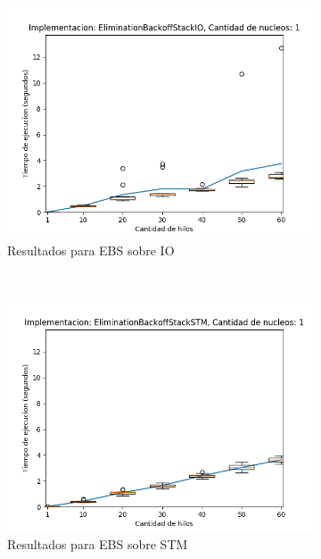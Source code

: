 \begin{appendices}
\begin{figure}[t]
    \centering
    \begin{subfigure}[b]{0.49\textwidth}
        \includegraphics[width=\textwidth]{images/numberOfThreads/plots/expEBSIO-1}
        \caption{Resultados para EBS sobre IO}
        \label{subfig:numberOfThreads-ebsio-1}
    \end{subfigure}
    ~
    \begin{subfigure}[b]{0.49\textwidth}
        \includegraphics[width=\textwidth]{images/numberOfThreads/plots/expEBSSTM-1}
        \caption{Resultados para EBS sobre STM}
        \label{subfig:numberOfThreads-ebsstm-1}
    \end{subfigure}
    \begin{subfigure}[b]{0.49\textwidth}

\end{subfigure}
\end{figure}
\end{appendices}
